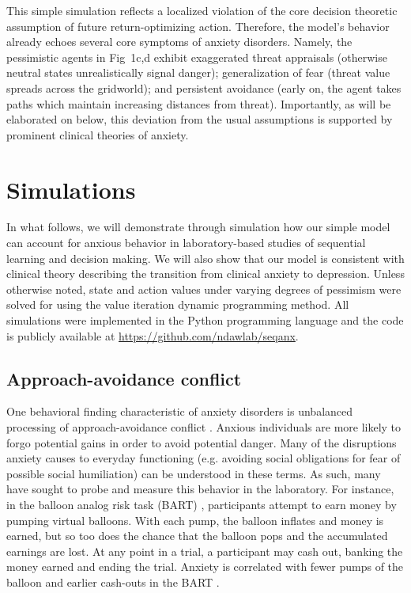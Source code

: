 \documentclass[11pt]{article} %
\begin{document}
This simple simulation reflects a localized violation of the core decision theoretic assumption of future return-optimizing action. Therefore, the model's behavior already echoes several core symptoms of anxiety disorders. Namely, the pessimistic agents in Fig~1c,d exhibit exaggerated threat appraisals (otherwise neutral states unrealistically signal danger); generalization of fear (threat value spreads across the gridworld); and persistent avoidance (early on, the agent takes paths which maintain increasing distances from threat). Importantly, as will be elaborated on below, this deviation from the usual assumptions is supported by prominent clinical theories of anxiety.

\section{Simulations}

In what follows, we will demonstrate through simulation how our simple model can account for anxious behavior in laboratory-based studies of sequential learning and decision making. We will also show that our model is consistent with clinical theory describing the transition from clinical anxiety to depression. Unless otherwise noted, state and action values under varying degrees of pessimism were solved for using the value iteration dynamic programming method\citep{SuttonBarto2018}. All simulations were implemented in the Python programming language and the code is publicly available at \url{https://github.com/ndawlab/seqanx}. 

\subsection{Approach-avoidance conflict}

One behavioral finding characteristic of anxiety disorders is unbalanced processing of approach-avoidance conflict \citep{aupperle2010}. Anxious individuals are more likely to forgo potential gains in order to avoid potential danger. Many of the disruptions anxiety causes to everyday functioning (e.g. avoiding social obligations for fear of possible social humiliation) can be understood in these terms. As such, many have sought to probe and measure this behavior in the laboratory. For instance, in the balloon analog risk task (BART) \citep{Lejuez2002}, participants attempt to earn money by pumping virtual balloons. With each pump, the balloon inflates and money is earned, but so too does the chance that the balloon pops and the accumulated earnings are lost. At any point in a trial, a participant may cash out, banking the money earned and ending the trial. Anxiety is correlated with fewer pumps of the balloon and earlier cash-outs in the BART \citep{Maner2007, ramirez2015}.
\end{document}
